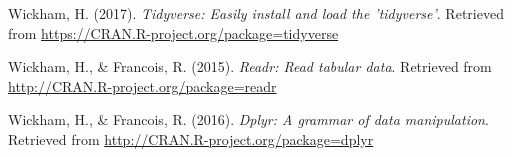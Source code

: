 \documentclass[12pt,oneside]{reedthesis}
\theoremstyle{definition}
\theoremstyle{definition}
\theoremstyle{definition}
\theoremstyle{remark}
\begin{document}
  \hypertarget{ref-wickham2017}{}
  Wickham, H. (2017). \emph{Tidyverse: Easily install and load the
  'tidyverse'}. Retrieved from
  \url{https://CRAN.R-project.org/package=tidyverse}
  
  \hypertarget{ref-wickhamfrancois2015}{}
  Wickham, H., \& Francois, R. (2015). \emph{Readr: Read tabular data}.
  Retrieved from \url{http://CRAN.R-project.org/package=readr}
  
  \hypertarget{ref-wickhamfrancois2016}{}
  Wickham, H., \& Francois, R. (2016). \emph{Dplyr: A grammar of data
  manipulation}. Retrieved from
  \url{http://CRAN.R-project.org/package=dplyr}


\end{document}

